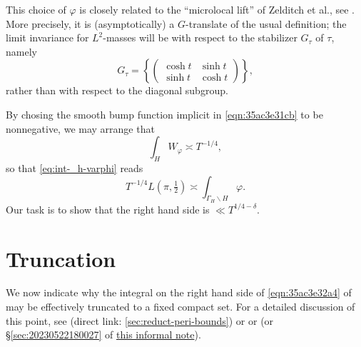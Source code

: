 \documentclass[reqno]{amsart} 
\numberwithin{equation}{section}
\numberwithin{theorem}{section}
\begin{document}
\begin{remark}
  This choice of $\varphi$ is closely related to the ``microlocal lift'' of Zelditch \cite{MR916129} et al., see \cite{MR1859345, MR2346281, MR2314452}.  More precisely, it is (asymptotically) a $G$-translate of the usual definition; the limit invariance for $L^2$-masses will be with respect to the stabilizer $G_\tau$ of $\tau$, namely
\begin{equation}\label{eqn:G-tau}
  G_\tau = \left\{ \begin{pmatrix}
      \cosh t & \sinh t \\
      \sinh t & \cosh t
    \end{pmatrix} \right\},
\end{equation}
rather than with respect to the diagonal subgroup.
\end{remark}

By chosing the smooth bump function implicit in \eqref{eqn:35ac3e31cb} to be nonnegative, we may arrange that
\begin{equation*}
  \int_{H} W_\varphi \asymp  T^{-1/4},
\end{equation*}
so that \eqref{eq:int-_h-varphi} reads
\begin{equation}\label{eqn:35ac3e32a4}
  T^{-1/4} L(\pi,\tfrac{1}{2}) \asymp  \int_{\Gamma_{H} \backslash H} \varphi.
\end{equation}
Our task is to show that the right hand side is $\ll T^{1/4-\delta}$.


\section{Truncation}\label{sec:orgc98f847}
We now indicate why the integral on the right hand side of \eqref{eqn:35ac3e32a4} of may be effectively truncated to a fixed compact set.  For a detailed discussion of this point, see \cite[\S5.3]{2021arXiv210915230N} (direct link: \ref{sec:reduct-peri-bounds}) or \cite[\S5.1.4]{michel-2009} or \cite[\S3]{2020arXiv200406791S} (or \S\ref{sec:20230522180027} of \href{20230522T174726__shrinking-archimedean-families-second-moment-gl2.pdf}{this informal note}).
\end{document}
